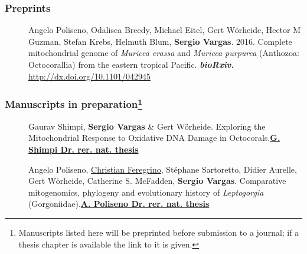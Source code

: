 \documentclass[letter,10pt]{article}
\begin{document}
\subsubsection*{Preprints}
\begin{description}
  \item[]Angelo Poliseno, Odalisca Breedy, Michael Eitel, Gert W\"orheide, Hector M Guzman, Stefan Krebs, Helmuth Blum, \textbf{Sergio Vargas}. 2016. Complete mitochondrial genome of \emph{Muricea crassa} and \emph{Muricea purpurea} (Anthozoa: Octocorallia) from the eastern tropical Pacific. \textbf{\emph{bioRxiv.}} \href{http://dx.doi.org/10.1101/042945}{http://dx.doi.org/10.1101/042945}
\end{description}

\subsubsection*{Manuscripts in preparation\footnote{Manuscripts listed here will be preprinted before submission to a journal; if a thesis chapter is available the link to it is given.}}
\begin{description}

\item[]Gaurav Shimpi, \textbf{Sergio Vargas} \& Gert W\"orheide. Exploring the Mitochondrial Response to Oxidative DNA Damage in Octocorals.\hfill\textbf{{\scriptsize\href{https://edoc.ub.uni-muenchen.de/19021/}{G. Shimpi Dr. rer. nat. thesis}}}


\item[]Angelo Poliseno, \underline{Christian Feregrino}, St\'ephane Sartoretto, Didier Aurelle, Gert W\"orheide, Catherine S. McFadden, \textbf{Sergio Vargas}. Comparative mitogenomics, phylogeny and evolutionary history of \emph{Leptogorgia} (Gorgoniidae).\hfill\textbf{{\scriptsize\href{https://edoc.ub.uni-muenchen.de/19888/}{A. Poliseno Dr. rer. nat. thesis}}}

\end{description}
\end{document}
